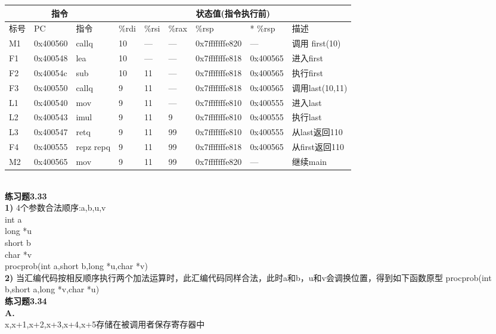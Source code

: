 \documentclass{article}
\begin{document}
\begin{CJK}{UTF8}{uyhei}
\begin{table}[htbp]
\begin{tabular}{|m{3em}<{\centering}|m{8em}<{\centering}|m{3em}<{\centering}|m{4em}<{\centering}|m{4em}<{\centering}|m{4em}<{\centering}|m{8em}<{\centering}|m{4em}<{\centering}|m{8em}<{\centering}|}
\hline
\multicolumn{3}{|c}{指令}	&	\multicolumn{6}{|c|}{状态值(指令执行前)}	\\
\hline
标号	&	PC	&	指令	&	\%rdi	&	\%rsi	&	\%rax	&	\%rsp	&	* \%rsp	&	描述	\\
\hline
M1	&	0x400560	&	callq	&	10	&	---	&	---	&	0x7fffffffe820	&	---	&	调用 first(10)	\\
\hline
F1	&	0x400548	&	lea	&	10	&	---	&	---	&	0x7fffffffe818	&	0x400565	&	进入first	\\
\hline
F2	&	0x40054c	&	sub	&	10	&	11	&	---	&	0x7fffffffe818	&	0x400565	&	执行first	\\
\hline
F3	&	0x400550	&	callq	&	9	&	11	&	---	&	0x7fffffffe818	&	0x400565	&	调用last(10,11)	\\
\hline
L1	&	0x400540	&	mov	&	9	&	11	&	---	&	0x7fffffffe810	&	0x400555	&	进入last	\\
\hline
L2	&	0x400543	&	imul	&	9	&	11	&	9	&	0x7fffffffe810	&	0x400555	&	执行last	\\
\hline
L3	&	0x400547	&	retq	&	9	&	11	&	99	&	0x7fffffffe810	&	0x400555	&	从last返回110	\\
\hline
F4	&	0x400555	&	repz repq	&	9	&	11	&	99	&	0x7fffffffe818	&	0x400565	&	从first返回110	\\
\hline
M2	&	0x400565	&	mov	&	9	&	11	&	99	&	0x7fffffffe820	&	---	&	继续main	\\
\hline
\end{tabular}
\end{table}	\\[2ex]
\textbf{练习题3.33}	\\
\textbf{1)} 4个参数合法顺序:a,b,u,v	\\
int a	\\
long *u	\\
short b	\\
char *v	\\
procprob(int a,short b,long *u,char *v)	\\
\textbf{2)} 当汇编代码按相反顺序执行两个加法运算时，此汇编代码同样合法，此时a和b，u和v会调换位置，得到如下函数原型
procprob(int b,short a,long *v,char *u)	\\[3ex]
\textbf{练习题3.34}	\\
\textbf{A.}	\\
x,x+1,x+2,x+3,x+4,x+5存储在被调用者保存寄存器中	\\

\end{CJK}
\end{document}
